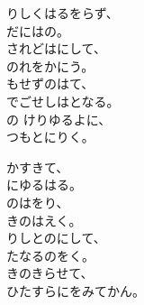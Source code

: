 \documentclass[10pt,b5j]{tarticle} %
\begin{document}
\vspace{1.5em} %
\newcommand{\linespace}{0.5em} %
\newcommand{\blocksize}{0.5\hsize} %
\begin{enumerate} %
    \begin{minipage}[c]{\blocksize}
    
        \vspace{\linespace}
        \item
        りしくはるをらず、\\
        だにはの。\\
        されどはにして、\\
        のれをかにう。\\
        もせずのはて、\\
        でごせしはとなる。\\
        の けりゆるよに、\\
        つもとにりく。
        
        \vspace{\linespace}
        \item
        かすきて、\\
        にゆるはる。\\
        のはをり、\\
        きのはえく。\\
        りしとのにして、\\
        たなるのをく。\\
        きのきらせて、\\
        ひたすらにをみてかん。
    
    \end{minipage}
\end{enumerate} %
\end{document}
